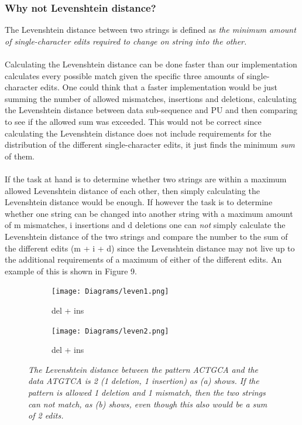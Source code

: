\documentclass[12pt]{article}
\newcommand{\pu}{PU }
\begin{document}
\subsubsection{Why not Levenshtein distance?}
The Levenshtein distance between two strings is defined as \textit{the minimum amount of single-character edits required
to change on string into the other.}~\cite{leve} \\ \\
Calculating the Levenshtein distance can be done faster than our implementation calculates
every possible match given the specific three amounts of single-character edits. One could think that a faster 
implementation would be just summing
the number of allowed mismatches, insertions and deletions, calculating the Levenshtein distance between data sub-sequence
and \pu and then comparing to see if the allowed sum was exceeded. This would not be correct since
calculating the Levenshtein distance does not include requirements for the distribution of the different 
single-character edits, it just finds the minimum \textit{sum} of them. \\ \\
If the task at hand is to determine whether two strings are within a maximum allowed Levenshtein distance of each other,
then simply calculating the Levenshtein distance would be enough. 
If however the task is to determine whether one string can be changed into another string with a maximum amount of m 
mismatches, i insertions and d deletions one can \textit{not} simply calculate the Levenshtein distance of the two
strings and compare the number to the sum of the different edits (m + i + d) since the Levenshtein distance may not live
up to the additional requirements of a maximum of either of the different edits. An example of this is shown in Figure 9. \\
\begin{figure}[H]
\centering
\begin{subfigure}[b]{0.4 \textwidth}
\texttt{[image: Diagrams/leven1.png]}
\caption{del + ins}
\end{subfigure}
\hspace{12mm}
\begin{subfigure}[b]{0.4 \textwidth}
\texttt{[image: Diagrams/leven2.png]}
\caption{del + ins}
\end{subfigure}
\caption{\textit{The Levenshtein distance between the pattern ACTGCA and the data ATGTCA is 2 
(1 deletion, 1 insertion) as (a) shows. If the pattern is allowed 1 deletion and 1 mismatch, then
the two strings can not match, as (b) shows, even though this also would be a sum of 2 edits.}}
\end{figure}
\end{document}
